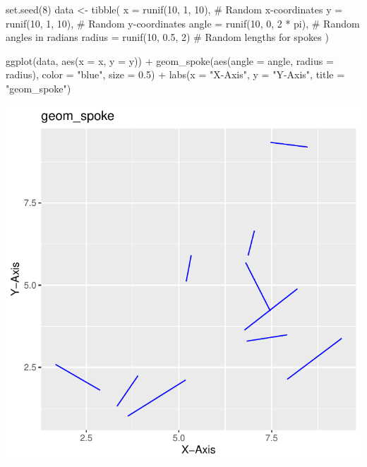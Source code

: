 \documentclass[
  letterpaper,
  DIV=11,
  numbers=noendperiod]{scrreprt}
\newenvironment{Shaded}{\begin{snugshade}}{\end{snugshade}}
\newcommand{\AttributeTok}[1]{\textcolor[rgb]{0.40,0.45,0.13}{#1}}
\newcommand{\CommentTok}[1]{\textcolor[rgb]{0.37,0.37,0.37}{#1}}
\newcommand{\DecValTok}[1]{\textcolor[rgb]{0.68,0.00,0.00}{#1}}
\newcommand{\FloatTok}[1]{\textcolor[rgb]{0.68,0.00,0.00}{#1}}
\newcommand{\FunctionTok}[1]{\textcolor[rgb]{0.28,0.35,0.67}{#1}}
\newcommand{\NormalTok}[1]{\textcolor[rgb]{0.00,0.23,0.31}{#1}}
\newcommand{\OtherTok}[1]{\textcolor[rgb]{0.00,0.23,0.31}{#1}}
\newcommand{\SpecialCharTok}[1]{\textcolor[rgb]{0.37,0.37,0.37}{#1}}
\newcommand{\StringTok}[1]{\textcolor[rgb]{0.13,0.47,0.30}{#1}}
\begin{document}
\begin{Shaded}
\begin{Highlighting}[]
\FunctionTok{set.seed}\NormalTok{(}\DecValTok{8}\NormalTok{)}
\NormalTok{data }\OtherTok{\textless{}{-}} \FunctionTok{tibble}\NormalTok{(}
  \AttributeTok{x =} \FunctionTok{runif}\NormalTok{(}\DecValTok{10}\NormalTok{, }\DecValTok{1}\NormalTok{, }\DecValTok{10}\NormalTok{),      }\CommentTok{\# Random x{-}coordinates}
  \AttributeTok{y =} \FunctionTok{runif}\NormalTok{(}\DecValTok{10}\NormalTok{, }\DecValTok{1}\NormalTok{, }\DecValTok{10}\NormalTok{),      }\CommentTok{\# Random y{-}coordinates}
  \AttributeTok{angle =} \FunctionTok{runif}\NormalTok{(}\DecValTok{10}\NormalTok{, }\DecValTok{0}\NormalTok{, }\DecValTok{2} \SpecialCharTok{*}\NormalTok{ pi),  }\CommentTok{\# Random angles in radians}
  \AttributeTok{radius =} \FunctionTok{runif}\NormalTok{(}\DecValTok{10}\NormalTok{, }\FloatTok{0.5}\NormalTok{, }\DecValTok{2}\NormalTok{) }\CommentTok{\# Random lengths for spokes}
\NormalTok{)}


\FunctionTok{ggplot}\NormalTok{(data, }\FunctionTok{aes}\NormalTok{(}\AttributeTok{x =}\NormalTok{ x, }\AttributeTok{y =}\NormalTok{ y)) }\SpecialCharTok{+}
  \FunctionTok{geom\_spoke}\NormalTok{(}\FunctionTok{aes}\NormalTok{(}\AttributeTok{angle =}\NormalTok{ angle, }\AttributeTok{radius =}\NormalTok{ radius),}
             \AttributeTok{color =} \StringTok{"blue"}\NormalTok{, }\AttributeTok{size =} \FloatTok{0.5}\NormalTok{) }\SpecialCharTok{+}
  \FunctionTok{labs}\NormalTok{(}\AttributeTok{x =} \StringTok{"X{-}Axis"}\NormalTok{, }
       \AttributeTok{y =} \StringTok{"Y{-}Axis"}\NormalTok{, }
       \AttributeTok{title =} \StringTok{"geom\_spoke"}\NormalTok{) }
\end{Highlighting}
\end{Shaded}

\includegraphics{s_files/figure-pdf/unnamed-chunk-6-1.pdf}
\end{document}
